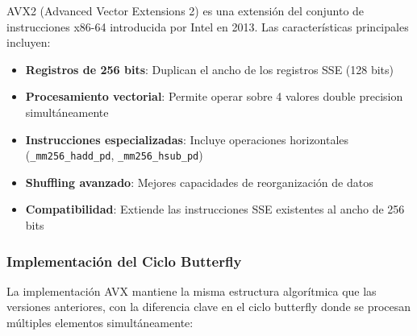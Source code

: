 \documentclass[a4paper]{article}
\begin{document}
AVX2 (Advanced Vector Extensions 2) es una extensión del conjunto de instrucciones x86-64 introducida por Intel en 2013. Las características principales incluyen:

\begin{itemize}
    \item \textbf{Registros de 256 bits}: Duplican el ancho de los registros SSE (128 bits)
    \item \textbf{Procesamiento vectorial}: Permite operar sobre 4 valores double precision simultáneamente
    \item \textbf{Instrucciones especializadas}: Incluye operaciones horizontales (\texttt{\_mm256\_hadd\_pd}, \texttt{\_mm256\_hsub\_pd})
    \item \textbf{Shuffling avanzado}: Mejores capacidades de reorganización de datos
    \item \textbf{Compatibilidad}: Extiende las instrucciones SSE existentes al ancho de 256 bits
\end{itemize}

\subsubsection{Implementación del Ciclo Butterfly}

La implementación AVX mantiene la misma estructura algorítmica que las versiones anteriores, con la diferencia clave en el ciclo butterfly donde se procesan múltiples elementos simultáneamente:
\end{document}
